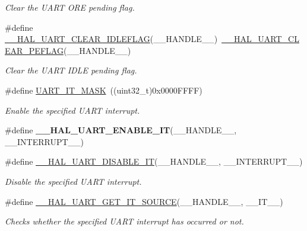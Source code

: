 \begin{DoxyCompactItemize}
\begin{DoxyCompactList}\small\item\em Clear the U\+A\+RT O\+RE pending flag. \end{DoxyCompactList}\item 
\#define \hyperlink{group___u_a_r_t___exported___macros_ga1345aa0af53d82269b13835c225e91d0}{\+\_\+\+\_\+\+H\+A\+L\+\_\+\+U\+A\+R\+T\+\_\+\+C\+L\+E\+A\+R\+\_\+\+I\+D\+L\+E\+F\+L\+AG}(\+\_\+\+\_\+\+H\+A\+N\+D\+L\+E\+\_\+\+\_\+)~\hyperlink{group___u_a_r_t___exported___macros_gaba5e19c60e0f37341b1585a380b84d49}{\+\_\+\+\_\+\+H\+A\+L\+\_\+\+U\+A\+R\+T\+\_\+\+C\+L\+E\+A\+R\+\_\+\+P\+E\+F\+L\+AG}(\+\_\+\+\_\+\+H\+A\+N\+D\+L\+E\+\_\+\+\_\+)
\begin{DoxyCompactList}\small\item\em Clear the U\+A\+RT I\+D\+LE pending flag. \end{DoxyCompactList}\item 
\#define \hyperlink{group___u_a_r_t___exported___macros_ga869439269c26e8dee93d49b1c7e67448}{U\+A\+R\+T\+\_\+\+I\+T\+\_\+\+M\+A\+SK}~((uint32\+\_\+t)0x0000\+F\+F\+F\+F)
\begin{DoxyCompactList}\small\item\em Enable the specified U\+A\+RT interrupt. \end{DoxyCompactList}\item 
\#define {\bfseries \+\_\+\+\_\+\+H\+A\+L\+\_\+\+U\+A\+R\+T\+\_\+\+E\+N\+A\+B\+L\+E\+\_\+\+IT}(\+\_\+\+\_\+\+H\+A\+N\+D\+L\+E\+\_\+\+\_\+,  \+\_\+\+\_\+\+I\+N\+T\+E\+R\+R\+U\+P\+T\+\_\+\+\_\+)
\item 
\#define \hyperlink{group___u_a_r_t___exported___macros_ga3c29b33f38658acbf592e9aaf84c6f33}{\+\_\+\+\_\+\+H\+A\+L\+\_\+\+U\+A\+R\+T\+\_\+\+D\+I\+S\+A\+B\+L\+E\+\_\+\+IT}(\+\_\+\+\_\+\+H\+A\+N\+D\+L\+E\+\_\+\+\_\+,  \+\_\+\+\_\+\+I\+N\+T\+E\+R\+R\+U\+P\+T\+\_\+\+\_\+)
\begin{DoxyCompactList}\small\item\em Disable the specified U\+A\+RT interrupt. \end{DoxyCompactList}\item 
\#define \hyperlink{group___u_a_r_t___exported___macros_gab7ad503802bf56bf397c392fc8e18b77}{\+\_\+\+\_\+\+H\+A\+L\+\_\+\+U\+A\+R\+T\+\_\+\+G\+E\+T\+\_\+\+I\+T\+\_\+\+S\+O\+U\+R\+CE}(\+\_\+\+\_\+\+H\+A\+N\+D\+L\+E\+\_\+\+\_\+,  \+\_\+\+\_\+\+I\+T\+\_\+\+\_\+)
\begin{DoxyCompactList}\small\item\em Checks whether the specified U\+A\+RT interrupt has occurred or not. \end{DoxyCompactList}\item 

\end{DoxyCompactItemize}
